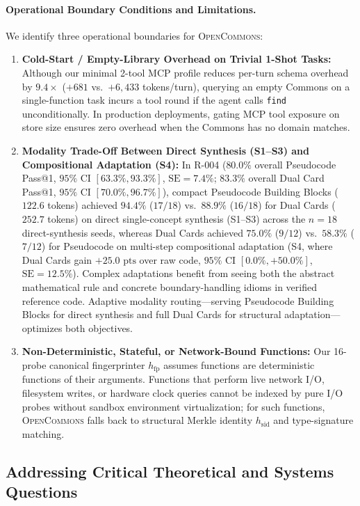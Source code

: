 \documentclass[10pt,twocolumn]{article}
\begin{document}
\paragraph{Operational Boundary Conditions and Limitations.}
We identify three operational boundaries for \textsc{OpenCommons}:
\begin{enumerate}
    \item \textbf{Cold-Start / Empty-Library Overhead on Trivial 1-Shot Tasks:} Although our minimal 2-tool MCP profile reduces per-turn schema overhead by $9.4\times$ ($+681$ vs.\ $+6{,}433$ tokens/turn), querying an empty Commons on a single-function task incurs a tool round if the agent calls \texttt{find} unconditionally. In production deployments, gating MCP tool exposure on store size ensures zero overhead when the Commons has no domain matches.
    \item \textbf{Modality Trade-Off Between Direct Synthesis (S1--S3) and Compositional Adaptation (S4):} In R-004 ($80.0\%$ overall Pseudocode Pass@1, $95\%$ CI $[63.3\%, 93.3\%]$, $\text{SE} = 7.4\%$; $83.3\%$ overall Dual Card Pass@1, $95\%$ CI $[70.0\%, 96.7\%]$), compact Pseudocode Building Blocks ($122.6$ tokens) achieved $94.4\%$ ($17/18$) vs.\ $88.9\%$ ($16/18$) for Dual Cards ($252.7$ tokens) on direct single-concept synthesis (S1--S3) across the $n=18$ direct-synthesis seeds, whereas Dual Cards achieved $75.0\%$ ($9/12$) vs.\ $58.3\%$ ($7/12$) for Pseudocode on multi-step compositional adaptation (S4, where Dual Cards gain $+25.0\text{ pts}$ over raw code, $95\%$ CI $[0.0\%, +50.0\%]$, $\text{SE} = 12.5\%$). Complex adaptations benefit from seeing both the abstract mathematical rule and concrete boundary-handling idioms in verified reference code. Adaptive modality routing—serving Pseudocode Building Blocks for direct synthesis and full Dual Cards for structural adaptation—optimizes both objectives.
    \item \textbf{Non-Deterministic, Stateful, or Network-Bound Functions:} Our 16-probe canonical fingerprinter $h_{\text{fp}}$ assumes functions are deterministic functions of their arguments. Functions that perform live network I/O, filesystem writes, or hardware clock queries cannot be indexed by pure I/O probes without sandbox environment virtualization; for such functions, \textsc{OpenCommons} falls back to structural Merkle identity $h_{\text{sid}}$ and type-signature matching.
\end{enumerate}

\subsection{Addressing Critical Theoretical and Systems Questions}
\label{sec:critical_questions}
\end{document}
